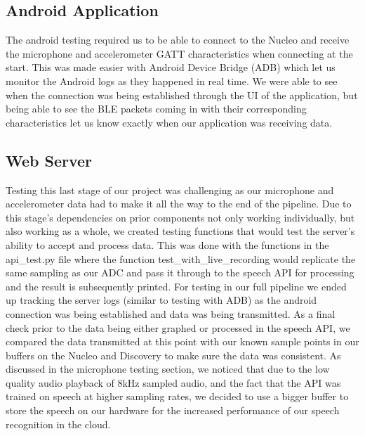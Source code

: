 \subsection{Android Application}
The android testing required us to be able to connect to the Nucleo and receive the microphone and accelerometer GATT characteristics when connecting at the start. This was made easier with Android Device Bridge (ADB) which let us monitor the Android logs as they happened in real time. We were able to see when the connection was being established through the UI of the application, but being able to see the BLE packets coming in with their corresponding characteristics let us know exactly when our application was receiving data. 

\subsection{Web Server}
Testing this last stage of our project was challenging as our microphone and accelerometer data had to make it all the way to the end of the pipeline. Due to this stage's dependencies on prior components not only working individually, but also working as a whole, we created testing functions that would test the server's ability to accept and process data. This was done with the functions in the api\_test.py file where the function 
test\_with\_live\_recording would replicate the same sampling as our ADC and pass it through to the speech API for processing and the result is subsequently printed. For testing in our full pipeline we ended up tracking the server logs (similar to testing with ADB) as the android connection was being established and data was being transmitted. As a final check prior to the data being either graphed or processed in the speech API, we compared the data transmitted at this point with our known sample points in our buffers on the Nucleo and Discovery to make sure the data was consistent. As discussed in the microphone testing section, we noticed that due to the low quality audio playback of 8kHz sampled audio, and the fact that the API was trained on speech at higher sampling rates, we decided to use a bigger buffer to store the speech on our hardware for the increased performance of our speech recognition in the cloud.

